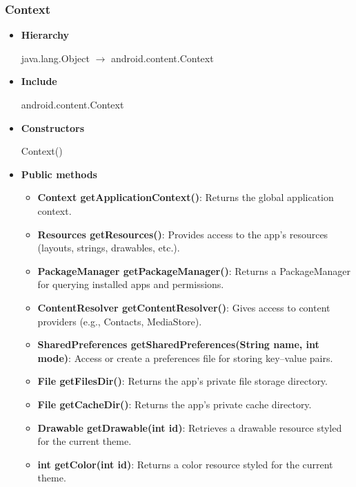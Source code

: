 \documentclass{report}
\begin{document}
    \subsubsection{Context}
    \begin{itemize}
         \item \textbf{Hierarchy} 
             \begin{center}
                 java.lang.Object $\to$	android.content.Context
             \end{center}
        \item \textbf{Include}
            \bigbreak \noindent 
            \begin{javacode}
                android.content.Context
            \end{javacode}
        \item \textbf{Constructors}
            \bigbreak \noindent 
            \begin{javacode}
                Context()
            \end{javacode}
        \item \textbf{Public methods}
            \begin{itemize}
                \item \textbf{Context getApplicationContext()}: Returns the global application context.
                \item \textbf{Resources getResources()}: Provides access to the app's resources (layouts, strings, drawables, etc.).
                \item \textbf{PackageManager getPackageManager()}: Returns a PackageManager for querying installed apps and permissions.
                \item \textbf{ContentResolver getContentResolver()}: Gives access to content providers (e.g., Contacts, MediaStore).
                \item \textbf{SharedPreferences getSharedPreferences(String name, int mode)}: Access or create a preferences file for storing key–value pairs.
                \item \textbf{File getFilesDir()}: Returns the app’s private file storage directory.
                \item \textbf{File getCacheDir()}: Returns the app’s private cache directory.
                \item \textbf{Drawable getDrawable(int id)}: Retrieves a drawable resource styled for the current theme.
                \item \textbf{int getColor(int id)}: Returns a color resource styled for the current theme.

\end{itemize}
\end{itemize}
\end{document}
